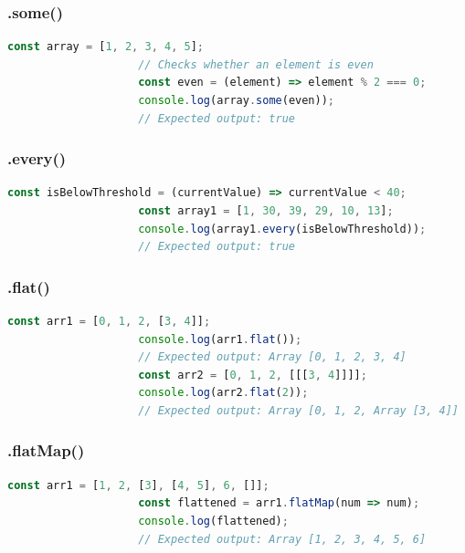 \documentclass[a4paper, landscape, 8pt]{scrartcl}
\begin{document}
\begin{multicols*}{4}
        \subsubsection{.some()}
        \begin{lstlisting}[language=JavaScript]
                    const array = [1, 2, 3, 4, 5];
                    // Checks whether an element is even
                    const even = (element) => element % 2 === 0;
                    console.log(array.some(even));
                    // Expected output: true
        \end{lstlisting}

        \subsubsection{.every()}
        \begin{lstlisting}[language=JavaScript]
                    const isBelowThreshold = (currentValue) => currentValue < 40;
                    const array1 = [1, 30, 39, 29, 10, 13];
                    console.log(array1.every(isBelowThreshold));
                    // Expected output: true
        \end{lstlisting}

        \subsubsection{.flat()}
        \begin{lstlisting}[language=JavaScript]
                    const arr1 = [0, 1, 2, [3, 4]];
                    console.log(arr1.flat());
                    // Expected output: Array [0, 1, 2, 3, 4]
                    const arr2 = [0, 1, 2, [[[3, 4]]]];
                    console.log(arr2.flat(2));
                    // Expected output: Array [0, 1, 2, Array [3, 4]]
        \end{lstlisting}

        \subsubsection{.flatMap()}
        \begin{lstlisting}[language=JavaScript]
                    const arr1 = [1, 2, [3], [4, 5], 6, []];
                    const flattened = arr1.flatMap(num => num);
                    console.log(flattened);
                    // Expected output: Array [1, 2, 3, 4, 5, 6]
        \end{lstlisting}


\end{multicols*}
\end{document}
